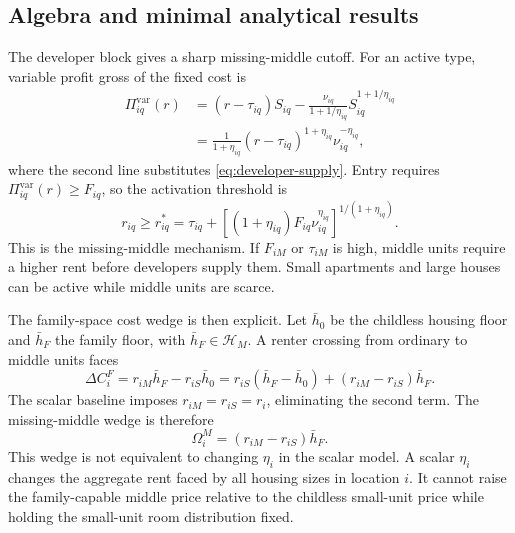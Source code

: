 \documentclass[11pt]{article}
\newcommand{\Hset}{\mathcal H}
\begin{document}
\subsection{Algebra and minimal analytical results}

The developer block gives a sharp missing-middle cutoff. For an active type, variable profit gross of the fixed cost is
\begin{equation}
\begin{aligned}
\Pi^{\mathrm{var}}_{iq}(r)
&=(r-\tau_{iq})S_{iq}
-\frac{\nu_{iq}}{1+1/\eta_{iq}}S_{iq}^{1+1/\eta_{iq}}\\
&=\frac{1}{1+\eta_{iq}}
(r-\tau_{iq})^{1+\eta_{iq}}\nu_{iq}^{-\eta_{iq}},
\end{aligned}
\label{eq:developer-variable-profit}
\end{equation}
where the second line substitutes \eqref{eq:developer-supply}. Entry requires $\Pi^{\mathrm{var}}_{iq}(r)\geq F_{iq}$, so the activation threshold is
\begin{equation}
    r_{iq}\geq
    r^*_{iq}
    =
    \tau_{iq}
    +
    \left[(1+\eta_{iq})F_{iq}\nu_{iq}^{\eta_{iq}}\right]^{1/(1+\eta_{iq})}.
    \label{eq:developer-entry-threshold}
\end{equation}
This is the missing-middle mechanism. If $F_{iM}$ or $\tau_{iM}$ is high, middle units require a higher rent before developers supply them. Small apartments and large houses can be active while middle units are scarce.

The family-space cost wedge is then explicit. Let $\bar h_0$ be the childless housing floor and $\bar h_F$ the family floor, with $\bar h_F\in\Hset_M$. A renter crossing from ordinary to middle units faces
\begin{equation}
    \Delta C^F_i
    =
    r_{iM}\bar h_F-r_{iS}\bar h_0
    =
    r_{iS}(\bar h_F-\bar h_0)
    +(r_{iM}-r_{iS})\bar h_F.
    \label{eq:developer-family-cost}
\end{equation}
The scalar baseline imposes $r_{iM}=r_{iS}=r_i$, eliminating the second term. The missing-middle wedge is therefore
\begin{equation}
    \Omega^M_i=(r_{iM}-r_{iS})\bar h_F.
    \label{eq:developer-middle-wedge}
\end{equation}
This wedge is not equivalent to changing $\eta_i$ in the scalar model. A scalar $\eta_i$ changes the aggregate rent faced by all housing sizes in location $i$. It cannot raise the family-capable middle price relative to the childless small-unit price while holding the small-unit room distribution fixed.
\end{document}
